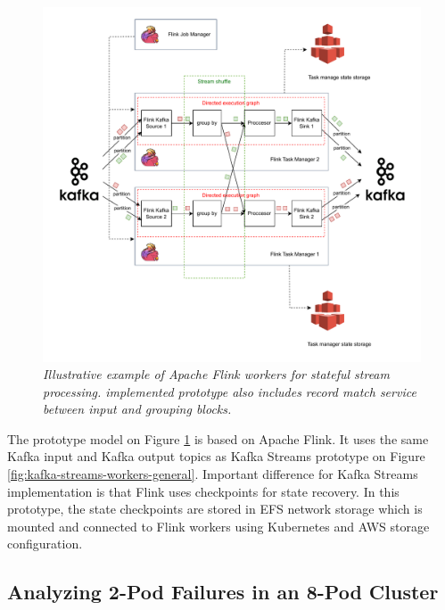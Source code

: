 \begin{figure}[H]
    \centering
    \includegraphics[width=1\textwidth]{figures/flink-shuffle}
    \caption{\textit{Illustrative example of Apache Flink workers for stateful stream processing.
    implemented prototype also includes record match service between input and grouping blocks.}}
    \label{fig:flink-workers-general}
\end{figure}

The prototype model on Figure \ref{fig:flink-workers-general} is based on Apache Flink.
It uses the same Kafka input and Kafka output topics as Kafka Streams prototype on Figure \ref{fig:kafka-streams-workers-general}.
Important difference for Kafka Streams implementation is that Flink uses checkpoints for
state recovery.
In this prototype, the state checkpoints are stored in EFS network storage which is mounted and connected to
Flink workers using Kubernetes and AWS storage configuration.


\subsection{Analyzing 2-Pod Failures in an 8-Pod Cluster}\label{subsec:analyzing-2-pod-failures-in-an-8-pod-cluster2}

